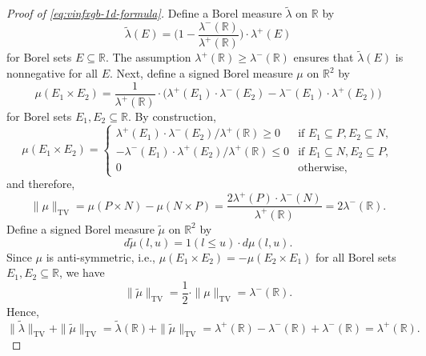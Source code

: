\documentclass[10pt]{article}
\newcommand{\R}{{\mathbb R}}
\begin{document}
\begin{proof}[Proof of \eqref{eq:vinfxgb-1d-formula}]
Define a Borel measure $\widetilde{\lambda}$ on $\R$ by 
\begin{equation*}
    \widetilde{\lambda}(E) 
    = \Big(1 - \frac{\lambda^-(\R)}{\lambda^+(\R)}\Big) \cdot \lambda^+(E)
\end{equation*}
for Borel sets $E \subseteq \R$. The assumption 
$\lambda^+(\R) \ge \lambda^-(\R)$ ensures that $\widetilde{\lambda}(E)$ 
is nonnegative for all $E$. 
Next, define a signed Borel measure $\mu$ on $\R^2$ by 
\begin{equation*}
    \mu(E_1 \times E_2) 
    = \frac{1}{\lambda^+(\R)} \cdot 
    \Big(\lambda^+(E_1) \cdot \lambda^-(E_2) 
    - \lambda^-(E_1) \cdot \lambda^+(E_2)\Big) 
\end{equation*}
for Borel sets $E_1, E_2 \subseteq \R$.
By construction,
\begin{equation*}
    \mu(E_1 \times E_2) = 
    \begin{cases}
    \lambda^+(E_1) \cdot \lambda^-(E_2) / \lambda^+(\R) \ge 0
    & \text{if } E_1 \subseteq P, E_2 \subseteq N, \\
    -\lambda^-(E_1) \cdot \lambda^+(E_2) / \lambda^+(\R) \le 0 
    & \text{if } E_1 \subseteq N, E_2 \subseteq P, \\
    0 & \text{otherwise},
    \end{cases}
\end{equation*}
and therefore, 
\begin{equation*}
    \|\mu\|_{\text{TV}} = \mu(P \times N) - \mu(N \times P) 
    = \frac{2\lambda^+(P) \cdot \lambda^-(N)}{\lambda^+(\R)} 
    = 2 \lambda^-(\R).
\end{equation*}
Define a signed Borel measure $\widetilde{\mu}$ on $\R^2$ by 
\begin{equation*}
    d\widetilde{\mu}(l, u) = 1(l \le u) \cdot d\mu(l, u).
\end{equation*}
Since $\mu$ is anti-symmetric, i.e., 
$\mu(E_1 \times E_2) = -\mu(E_2 \times E_1)$ for all Borel sets 
$E_1, E_2 \subseteq \R$, we have
\begin{equation*}
    \|\widetilde{\mu}\|_{\text{TV}} 
    = \frac{1}{2} \cdot \|\mu\|_{\text{TV}} = \lambda^-(\R).
\end{equation*}
Hence,
\begin{equation*}
    \|\widetilde{\lambda}\|_{\text{TV}} 
    + \|\widetilde{\mu}\|_{\text{TV}}
    = \widetilde{\lambda}(\R) + \|\widetilde{\mu}\|_{\text{TV}}
    = \lambda^+(\R) - \lambda^-(\R) + \lambda^-(\R)
    = \lambda^+(\R).
\end{equation*}


\end{proof}
\end{document}
